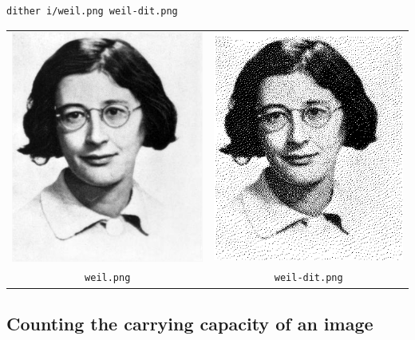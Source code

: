 \begin{verbatim}
dither i/weil.png weil-dit.png
\end{verbatim}
\begin{tabular}{cc}
	\includegraphics{i/weil.png} &
	\includegraphics{weil-dit.png} \\
	\verb+weil.png+ &
	\verb+weil-dit.png+
\end{tabular}

\subsection{Counting the carrying capacity of an image}

